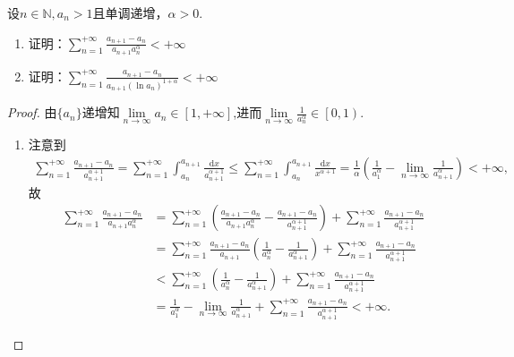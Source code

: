 \documentclass[../../main.tex]{subfiles}
\begin{document}
\begin{example}
设\( n \in \mathbb{N}, a_n > 1 \)且单调递增，\( \alpha > 0 \).
\begin{enumerate}
\item 证明：\( \sum_{n=1}^{+\infty} \frac{a_{n+1} - a_n}{a_{n+1}a_n^\alpha} < +\infty \)

\item 证明：\( \sum_{n=1}^{+\infty} \frac{a_{n+1} - a_n}{a_{n+1}(\ln a_n)^{1+\alpha}} < +\infty \)
\end{enumerate}
\end{example}
\begin{proof}
由$\{a_n\}$递增知$\underset{n\rightarrow \infty}{\lim}a_n\in \left[ 1,+\infty \right]$,进而$\underset{n\rightarrow \infty}{\lim}\frac{1}{a_{n}^{\alpha}}\in \left[ 0,1 \right)$.
\begin{enumerate}[(1)]
\item 注意到
\begin{align*}
\sum_{n=1}^{+\infty} \frac{a_{n+1} - a_n}{a_{n+1}^{\alpha + 1}} = \sum_{n=1}^{+\infty} \int_{a_n}^{a_{n+1}} \frac{\mathrm{d}x}{a_{n+1}^{\alpha + 1}} \leqslant \sum_{n=1}^{+\infty} \int_{a_n}^{a_{n+1}} \frac{\mathrm{d}x}{x^{\alpha + 1}} = \frac{1}{\alpha} \left( \frac{1}{a_1^{\alpha}} - \lim_{n \rightarrow \infty} \frac{1}{a_{n+1}^{\alpha}} \right) < +\infty,
\end{align*}
故
\begin{align*}
\sum_{n=1}^{+\infty} \frac{a_{n+1} - a_n}{a_{n+1}a_n^{\alpha}} &= \sum_{n=1}^{+\infty} \left( \frac{a_{n+1} - a_n}{a_{n+1}a_n^{\alpha}} - \frac{a_{n+1} - a_n}{a_{n+1}^{\alpha + 1}} \right) + \sum_{n=1}^{+\infty} \frac{a_{n+1} - a_n}{a_{n+1}^{\alpha + 1}} \\
&= \sum_{n=1}^{+\infty} \frac{a_{n+1} - a_n}{a_{n+1}} \left( \frac{1}{a_n^{\alpha}} - \frac{1}{a_{n+1}^{\alpha}} \right) + \sum_{n=1}^{+\infty} \frac{a_{n+1} - a_n}{a_{n+1}^{\alpha + 1}} \\
&< \sum_{n=1}^{+\infty} \left( \frac{1}{a_n^{\alpha}} - \frac{1}{a_{n+1}^{\alpha}} \right) + \sum_{n=1}^{+\infty} \frac{a_{n+1} - a_n}{a_{n+1}^{\alpha + 1}} \\
&= \frac{1}{a_1^{\alpha}} - \lim_{n \rightarrow \infty} \frac{1}{a_{n+1}^{\alpha}} + \sum_{n=1}^{+\infty} \frac{a_{n+1} - a_n}{a_{n+1}^{\alpha + 1}} < +\infty.
\end{align*}


\end{enumerate}
\end{proof}
\end{document}
